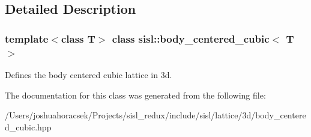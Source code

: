 \subsection{Detailed Description}
\subsubsection*{template$<$class T$>$\newline
class sisl\+::body\+\_\+centered\+\_\+cubic$<$ T $>$}

Defines the body centered cubic lattice in 3d. 

The documentation for this class was generated from the following file\+:\begin{DoxyCompactItemize}
\item 
/\+Users/joshuahoracsek/\+Projects/sisl\+\_\+redux/include/sisl/lattice/3d/body\+\_\+centered\+\_\+cubic.\+hpp\end{DoxyCompactItemize}
